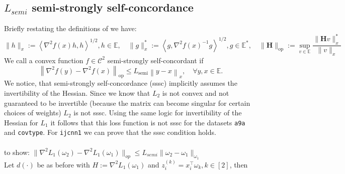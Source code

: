 \documentclass{article}
\begin{document}
\subsection{$L_{semi}$ semi-strongly self-concordance}
Briefly restating the definitions of \cite{hanzely2022damped} we have:
$$\|h\|_x := \left\langle \nabla^2 f(x) h, h \right\rangle^{1/2}, h \in \mathbb{E}, \quad
%
\|g\|_x^* := \left\langle g, \nabla^2 f(x)^{-1} g \right\rangle^{1/2}, g \in \mathbb{E}^*,\quad 
%
\|\mathbf{H}\|_{\text{op}} := \sup_{v \in \mathbb{E}} \frac{\|\mathbf{H} v\|_x^*}{\|v\|_x}
$$
We call a convex function $f \in \mathcal{C}^2$ semi-strongly self-concordant if
\[
\left\| \nabla^2 f(y) - \nabla^2 f(x) \right\|_{\mathrm{op}} \leq L_{\mathrm{semi}} \left\| y - x \right\|_x, \quad \forall y, x \in \mathbb{E}.
\]
We notice, that semi-strongly self-concordance (sssc) implicitly assumes the invertibility of the Hessian. Since we know that $L_2$ is not convex and not guaranteed to be invertible (because the matrix can become singular for certain choices of weights) $L_2$ is not sssc. Using the same logic for invertibility of the Hessian for $L_1$ it follows that this loss function is not sssc for the datasets \texttt{a9a} and \texttt{covtype}. For \texttt{ijcnn1} we can prove that the sssc condition holds.\\
\\
to show: $\| \nabla ^2 L_1 (\omega _2) - \nabla ^2 L_1 (\omega _1)\|_{op} \leq L_{semi} \| \omega_2 - \omega_1 \|_{\omega_1}$\\
Let $d(\cdot)$ be as before with $H := \nabla^2 L_1 (\omega_1)$ and $z_i^{(k)} = x_i ^\top \omega_k, k\in [2]$, then 
\end{document}
